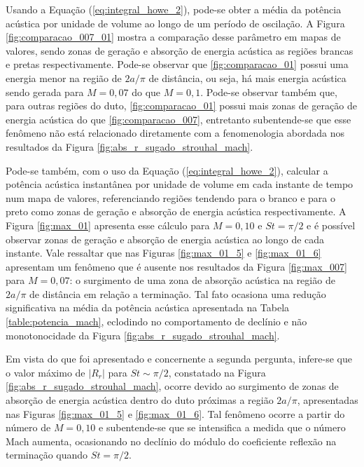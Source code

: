\newpage
Usando a Equação (\ref{eq:integral_howe_2}), pode-se obter a média da potência acústica por unidade de volume ao longo de um período de oscilação. A Figura \ref{fig:comparacao_007_01} mostra a comparação desse parâmetro em mapas de valores, sendo zonas de geração e absorção de energia acústica as regiões brancas e pretas respectivamente. Pode-se observar que \ref{fig:comparacao_01} possui uma energia menor na região de $2a/\pi$ de distância, ou seja, há mais energia acústica sendo gerada para $M = 0,07$ do que $M = 0,1$. Pode-se observar também que, para outras regiões do duto, \ref{fig:comparacao_01} possui mais zonas de geração de energia acústica do que \ref{fig:comparacao_007}, entretanto subentende-se que esse fenômeno não está relacionado diretamente com a fenomenologia abordada nos resultados da Figura \ref{fig:abs_r_sugado_strouhal_mach}.   

Pode-se também, com o uso da Equação (\ref{eq:integral_howe_2}), calcular a potência acústica instantânea por unidade de volume em cada instante de tempo num mapa de valores, referenciando regiões tendendo para o branco e para o preto como zonas de geração e absorção de energia acústica respectivamente. A Figura \ref{fig:max_01} apresenta esse cálculo para $M = 0,10$ e $St = \pi/2$ e é possível observar zonas de geração e absorção de energia acústica ao longo de cada instante. Vale ressaltar que nas Figuras \ref{fig:max_01_5} e \ref{fig:max_01_6} apresentam um fenômeno que é ausente nos resultados da Figura \ref{fig:max_007} para $M = 0,07$: o surgimento de uma zona de absorção acústica na região de $2a/\pi$ de distância em relação a terminação. Tal fato ocasiona uma redução significativa na média da potência acústica apresentada na Tabela \ref{table:potencia_mach}, eclodindo no comportamento de declínio e não monotonocidade da Figura \ref{fig:abs_r_sugado_strouhal_mach}.

Em vista do que foi apresentado e concernente a segunda pergunta, infere-se que o valor máximo de $|R_{r}|$ para $St \sim \pi/2$, constatado na Figura \ref{fig:abs_r_sugado_strouhal_mach}, ocorre devido ao surgimento de zonas de absorção de energia acústica dentro do duto próximas a região $2a/\pi$, apresentadas nas Figuras \ref{fig:max_01_5} e \ref{fig:max_01_6}. Tal fenômeno ocorre a partir do número de $M = 0,10$ e subentende-se que se intensifica a medida que o número Mach aumenta, ocasionando no declínio do módulo do coeficiente reflexão na terminação quando $St = \pi/2$.

